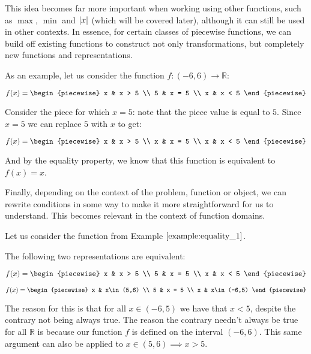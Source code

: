 This idea becomes far more important when working using other functions, such as $\max$, $\min$ and $\abs{x}$ (which will be covered later), although it can still be used in other contexts. In essence, for certain classes of piecewise functions, we can build off existing functions to construct not only transformations, but completely new functions and representations.
\begin{example}
    \label{example:equality_1}
    As an example, let us consider the function $f:(-6, 6)\to\mathbb{R}$:

    $$
        f(x) = \begin{piecewise}
            x & x > 5 \\
            5 & x = 5 \\
            x & x < 5
        \end{piecewise}
    $$

    Consider the piece for which $x=5$: note that the piece value is equal to $5$. Since $x=5$ we can replace $5$ with $x$ to get:

    $$
        f(x) = \begin{piecewise}
            x & x > 5 \\
            x & x = 5 \\
            x & x < 5
        \end{piecewise}
    $$

    And by the equality property, we know that this function is equivalent to $f(x)=x$.
\end{example}

Finally, depending on the context of the problem, function or object, we can rewrite conditions in some way to make it more straightforward for us to understand. This becomes relevant in the context of function domains.

\begin{example}
    Let us consider the function from Example $\ref{example:equality_1}$.

    The following two representations are equivalent:

    $$
        f(x) = \begin{piecewise}
            x & x > 5 \\
            5 & x = 5 \\
            x & x < 5
        \end{piecewise}
    $$

    $$
        f(x) = \begin{piecewise}
            x & x\in(5,6) \\
            5 & x = 5 \\
            x & x\in(-6,5)
        \end{piecewise}
    $$

    The reason for this is that for all $x\in(-6,5)$ we have that $x<5$, despite the contrary not being always true. The reason the contrary needn't always be true for all $\mathbb{R}$ is because our function $f$ is defined on the interval $(-6,6)$. This same argument can also be applied to $x\in(5,6)\implies x>5$.
\end{example}

